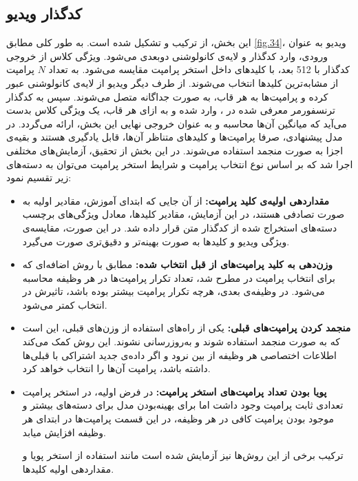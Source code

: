 \subsection{کدگذار ویدیو}
این بخش، از ترکیب  و  تشکیل شده است. به طور کلی مطابق \cref{fig.34}، ویدیو به عنوان ورودی، وارد کدگذار  و لایه‌ی کانولوشنی دو‌بعدی می‌شود. ویژگی کلاس از خروجی کدگذار  با 512 بعد، با کلیدهای داخل استخر پرامپت مقایسه می‌شود. به تعداد $N$ پرامپت از مشابه‌ترین کلیدها انتخاب می‌شوند. از طرف دیگر ویدیو از لایه‌ی کانولوشنی عبور کرده و پرامپت‌ها به هر قاب، به صورت جداگانه متصل می‌شوند. سپس به کدگذار ترنسفورمر معرفی شده در ، وارد شده و به ازای هر قاب، یک ویژگی کلاس بدست می‌آید که میانگین آن‌ها محاسبه و به عنوان خروجی نهایی این بخش، ارائه می‌گردد. در مدل پیشنهادی، صرفا پرامپت‌ها و کلیدهای متناظر آن‌ها، قابل یادگیری هستند و بقیه‌ی اجزا به صورت منجمد استفاده می‌شوند. در این بخش از تحقیق، آزمایش‌های مختلفی اجرا شد که بر اساس نوع انتخاب پرامپت و شرایط استخر پرامپت می‌توان به دسته‌‌های زیر تقسیم نمود:
\begin{itemize}
\item \textbf{مقداردهی اولیه‌ی کلید پرامپت:}
از آن جایی که ابتدای آموزش، مقادیر اولیه به صورت تصادفی هستند، در این آزمایش، مقادیر کلیدها، معادل ویژگی‌های برچسب دسته‌های استخراج شده از کدگذار متن قرار داده شد. در این صورت، مقایسه‌ی ویژگی ویدیو و کلیدها به صورت بهینه‌تر و دقیق‌تری صورت می‌گیرد. 
\item \textbf{وزن‌دهی به کلید پرامپت‌های از قبل انتخاب شده:}
مطابق با روش اضافه‌ای که برای انتخاب پرامپت در  مطرح شد، تعداد تکرار پرامپت‌ها در هر وظیفه محاسبه می‌شود. در وظیفه‌ی بعدی، هرچه تکرار پرامپت بیشتر بوده باشد، تاثیرش در انتخاب کمتر می‌شود. 
\item \textbf{منجمد کردن پرامپت‌های قبلی:}
یکی از راه‌های استفاده از وزن‌های قبلی، این است که به صورت منجمد استفاده شوند و به‌روزرسانی نشوند. این روش کمک می‌کند اطلاعات اختصاصی هر وظیفه از بین نرود و اگر داده‌ی جدید اشتراکی با قبلی‌ها داشته باشد، پرامپت آن‌ها را انتخاب خواهد کرد.
\item \textbf{پویا بودن تعداد پرامپت‌های استخر پرامپت:}
در فرض اولیه، در استخر پرامپت تعدادی ثابت پرامپت وجود داشت اما برای بهینه‌بودن مدل برای دسته‌های بیشتر و موجود بودن پرامپت کافی در هر وظیفه، در این قسمت پرامپت‌ها در ابتدای هر وظیفه افزایش میابد. 

ترکیب برخی از این روش‌ها نیز آزمایش شده است مانند استفاده از استخر پویا و مقداردهی اولیه کلیدها.  
\end{itemize}
